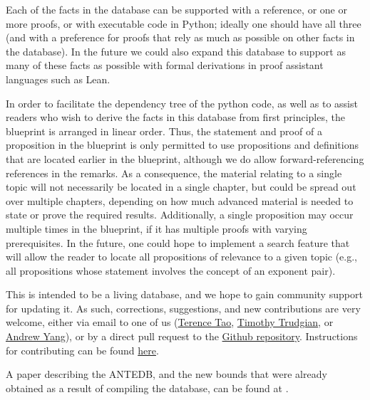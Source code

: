 Each of the facts in the database can be supported with a reference, or one or more proofs, or with executable code in Python; ideally one should have all three (and with a preference for proofs that rely as much as possible on other facts in the database).  In the future we could also expand this database to support as many of these facts as possible with formal derivations in proof assistant languages such as Lean.

In order to facilitate the dependency tree of the python code, as well as to assist readers who wish to derive the facts in this database from first principles, the blueprint is arranged in linear order.  Thus, the statement and proof of a proposition in the blueprint is only permitted to use propositions and definitions that are located earlier in the blueprint, although we do allow forward-referencing references in the remarks.  As a consequence, the material relating to a single topic will not necessarily be located in a single chapter, but could be spread out over multiple chapters, depending on how much advanced material is needed to state or prove the required results.  Additionally, a single proposition may occur multiple times in the blueprint, if it has multiple proofs with varying prerequisites.  In the future, one could hope to implement a search feature that will allow the reader to locate all propositions of relevance to a given topic (e.g., all propositions whose statement involves the concept of an exponent pair).

This is intended to be a living database, and we hope to gain community support for updating it.  As such, corrections, suggestions, and new contributions are very welcome, either via email to one of us (\href{mailto:tao@math.ucla.edu}{Terence Tao}, \href{mailto:timothy.trudgian@unsw.edu.au}{Timothy Trudgian}, or \href{mailto:andrew.yang1@unsw.edu.au}{Andrew Yang}), or by a direct pull request to the \href{https://github.com/teorth/expdb}{Github repository}.  Instructions for contributing can be found \href{https://github.com/teorth/expdb/blob/main/CONTRIBUTING.md}{here}.

A paper describing the ANTEDB, and the new bounds that were already obtained as a result of compiling the database, can be found at \cite{tao-trudgian-yang}.
